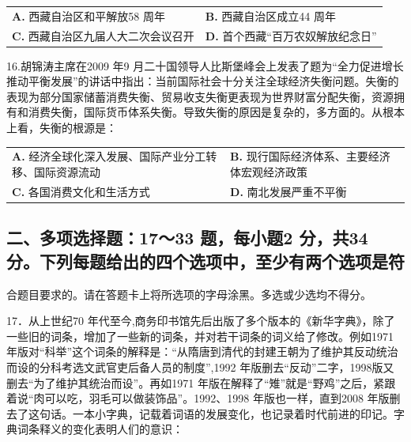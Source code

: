 \documentclass[UTF8,11pt]{ctexart}
\begin{document}
\begin{center}\begin{tabular}{>{\raggedright\arraybackslash}p{\dimexpr(\linewidth-4\tabcolsep)/2\relax}>{\raggedright\arraybackslash}p{\dimexpr(\linewidth-4\tabcolsep)/2\relax}}
\textbf{A.} 西藏自治区和平解放58 周年 & \textbf{B.} 西藏自治区成立44 周年\\[.35em]
\textbf{C.} 西藏自治区九届人大二次会议召开 & \textbf{D.} 首个西藏“百万农奴解放纪念日”\\[.35em]\end{tabular}\end{center}

16.胡锦涛主席在2009 年9 月二十国领导人比斯堡峰会上发表了题为“全力促进增长推动平衡发展”的讲话中指出：当前国际社会十分关注全球经济失衡问题。失衡的表现为部分国家储蓄消费失衡、贸易收支失衡更表现为世界财富分配失衡，资源拥有和消费失衡，国际货币体系失衡。导致失衡的原因是复杂的，多方面的。从根本上看，失衡的根源是：


\begin{center}\begin{tabular}{>{\raggedright\arraybackslash}p{\dimexpr(\linewidth-4\tabcolsep)/2\relax}>{\raggedright\arraybackslash}p{\dimexpr(\linewidth-4\tabcolsep)/2\relax}}
\textbf{A.} 经济全球化深入发展、国际产业分工转移、国际资源流动 & \textbf{B.} 现行国际经济体系、主要经济体宏观经济政策\\[.35em]
\textbf{C.} 各国消费文化和生活方式 & \textbf{D.} 南北发展严重不平衡\\[.35em]\end{tabular}\end{center}

\subsection*{二、多项选择题：17～33 题，每小题2 分，共34 分。下列每题给出的四个选项中，至少有两个选项是符}

合题目要求的。请在答题卡上将所选项的字母涂黑。多选或少选均不得分。


17．从上世纪70 年代至今,商务印书馆先后出版了多个版本的《新华字典》，除了一些旧的词条，增加了一些新的词条，并对若干词条的词义给了修改。例如1971 年版对“科举”这个词条的解释是：“从隋唐到清代的封建王朝为了维护其反动统治而设的分科考选文武官吏后备人员的制度”,1992 年版删去“反动”二字，1998版又删去“为了维护其统治而设”。再如1971 年版在解释了“雉”就是“野鸡”之后，紧跟着说“肉可以吃，羽毛可以做装饰品”。1992、1998 年版也一样，直到2008 年版删去了这句话。一本小字典，记载着词语的发展变化，也记录着时代前进的印记。字典词条释义的变化表明人们的意识：
\end{document}
